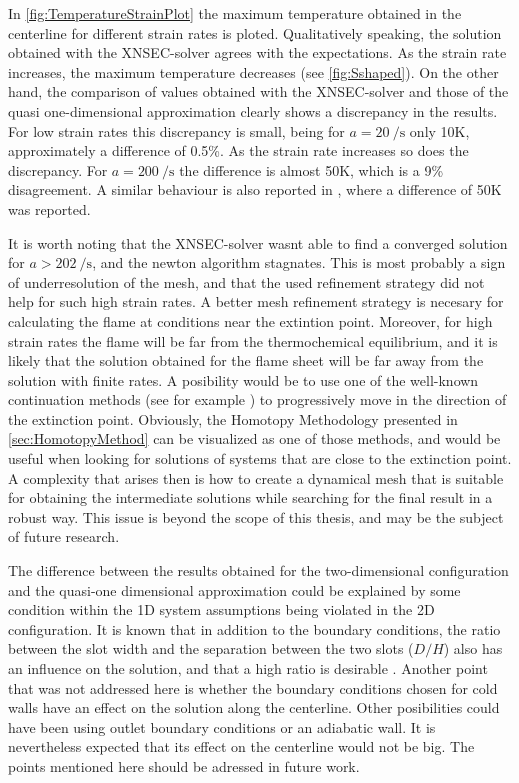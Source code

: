  
In \cref{fig:TemperatureStrainPlot} the maximum temperature obtained in the centerline for different strain rates is ploted. Qualitatively speaking, the solution obtained with the XNSEC-solver agrees with the expectations. As the strain rate increases, the maximum temperature decreases (see \cref{fig:Sshaped}). On the other hand, the comparison of values obtained with the XNSEC-solver and those of the quasi one-dimensional approximation clearly shows a discrepancy in the results. For low strain rates this discrepancy is small, being for $a = \SI{20}{\per\second}$ only 10K, approximately a difference of 0.5\%. As the strain rate increases so does the discrepancy. For $a = \SI{200}{\per\second}$ the difference is almost 50K, which is a 9\% disagreement. A similar behaviour is also reported in \cite{frouzakisTwodimensionalDirectNumerical1998}, where a difference of 50K was reported. 

It is worth noting that the XNSEC-solver wasnt able to find a converged solution for $a > \SI{202}{\per\second}$, and the newton algorithm stagnates. This is most probably a sign of underresolution of the mesh, and that the used refinement strategy did not help for such high strain rates. A better mesh refinement strategy is necesary for calculating the flame at conditions near the extintion point. 
Moreover, for high strain rates the flame will be far from the thermochemical equilibrium, and it is likely that the solution obtained for the flame sheet will be far away from the solution with finite rates. A posibility would be to use one of the well-known continuation methods (see for example \cite{nishiokaFlamecontrollingContinuationMethod1996}) to progressively move in the direction of the extinction point. Obviously, the Homotopy Methodology presented in \cref{sec:HomotopyMethod} can be visualized as one of those methods, and would be useful when looking for solutions of systems that are close to the extinction point. A complexity that arises then is how to create a dynamical mesh that is suitable for obtaining the intermediate solutions while searching for the final result in a robust way. This issue is beyond the scope of this thesis, and may be the subject of future research.


The difference between the results obtained for the two-dimensional configuration and the quasi-one dimensional approximation could be explained by some condition within the 1D system assumptions being violated in the 2D configuration. It is known that in addition to the boundary conditions, the ratio between the slot width and the separation between the two slots ($D/H$) also has an influence on the solution, and that a high ratio is desirable \citep{frouzakisTwodimensionalDirectNumerical1998}. Another point that was not addressed here is whether the boundary conditions chosen for cold walls have an effect on the solution along the centerline. Other posibilities could have been using outlet boundary conditions or an adiabatic wall. It is nevertheless expected that its effect on the centerline would not be big. The points mentioned here should be adressed in future work.

